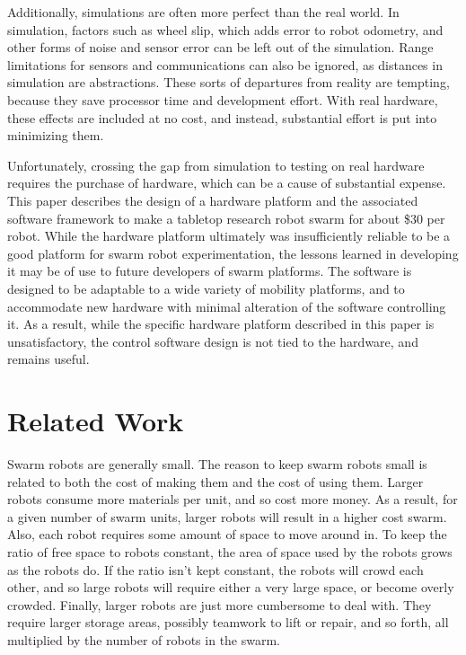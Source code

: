 \documentclass[]{article}
\begin{document}
Additionally, simulations are often more perfect than the real world. 
In simulation, factors such as wheel slip, which adds error to robot odometry, and other forms of noise and sensor error can be left out of the simulation. 
Range limitations for sensors and communications can also be ignored, as distances in simulation are abstractions. 
These sorts of departures from reality are tempting, because they save processor time and development effort. 
With real hardware, these effects are included at no cost, and instead, substantial effort is put into minimizing them.

Unfortunately, crossing the gap from simulation to testing on real hardware requires the purchase of hardware, which can be a cause of substantial expense. 
This paper describes the design of a hardware platform and the associated software framework to make a tabletop research robot swarm for about \$30 per robot. 
While the hardware platform ultimately was insufficiently reliable to be a good platform for swarm robot experimentation, the lessons learned in developing it may be of use to future developers of swarm platforms. 
The software is designed to be adaptable to a wide variety of mobility platforms, and to accommodate new hardware with minimal alteration of the software controlling it. 
As a result, while the specific hardware platform described in this paper is unsatisfactory, the control software design is not tied to the hardware, and remains useful. 

\section{Related Work}

Swarm robots are generally small. 
The reason to keep swarm robots small is related to both the cost of making them and the cost of using them. 
Larger robots consume more materials per unit, and so cost more money.
As a result, for a given number of swarm units, larger robots will result in a higher cost swarm. 
Also, each robot requires some amount of space to move around in. 
To keep the ratio of free space to robots constant, the area of space used by the robots grows as the robots do. 
If the ratio isn't kept constant, the robots will crowd each other, and so large robots will require either a very large space, or become overly crowded.
Finally, larger robots are just more cumbersome to deal with. 
They require larger storage areas, possibly teamwork to lift or repair, and so forth, all multiplied by the number of robots in the swarm. 
\end{document}
